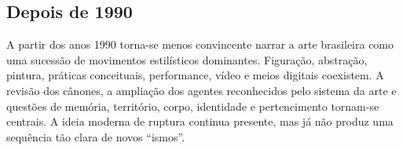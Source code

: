 \subsection{Depois de 1990}

A partir dos anos 1990 torna-se menos convincente narrar a arte brasileira como
uma sucessão de movimentos estilísticos dominantes. Figuração, abstração,
pintura, práticas conceituais, performance, vídeo e meios digitais coexistem.
A revisão dos cânones, a ampliação dos agentes reconhecidos pelo sistema da arte
e questões de memória, território, corpo, identidade e pertencimento tornam-se
centrais. A ideia moderna de ruptura continua presente, mas já não produz uma
sequência tão clara de novos ``ismos''.


